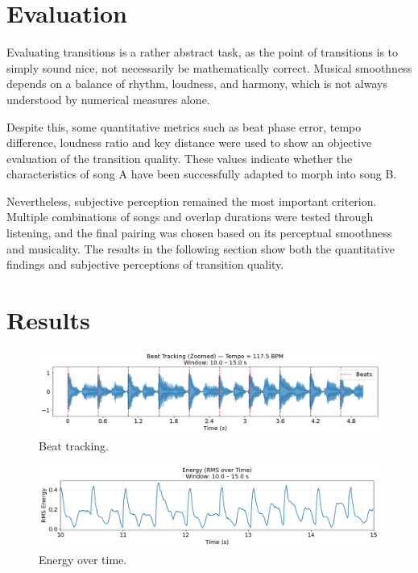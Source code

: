 \documentclass{article}
\begin{document}
\section{Evaluation}

Evaluating transitions is a rather abstract task, as the point of transitions is to simply sound nice, not necessarily be mathematically correct. Musical smoothness depends on a balance of rhythm, loudness, and harmony, which is not always understood by numerical measures alone.

Despite this, some quantitative metrics such as beat phase error, tempo difference, loudness ratio and key distance were used to show an objective evaluation of the transition quality. These values indicate whether the characteristics of song A have been successfully adapted to morph into song B.

Nevertheless, subjective perception remained the most important criterion. Multiple combinations of songs and overlap durations were tested through listening, and the final pairing was chosen based on its perceptual smoothness and musicality. The results in the following section show both the quantitative findings and subjective perceptions of transition quality.




\section{Results}

\begin{figure}[H]
    \centering
    \includegraphics[width=\textwidth]{figures/beat_tracking.png}
    \caption{Beat tracking.}
\end{figure}

\begin{figure}[H]
    \centering
    \includegraphics[width=\textwidth]{figures/energy.png}
    \caption{Energy over time.}
\end{figure}
\end{document}
